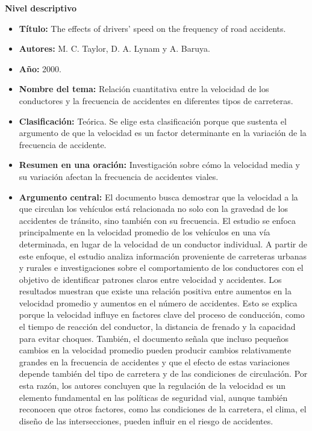 \documentclass[12pt]{article}
\begin{document}
\textbf{Nivel descriptivo}
\begin{itemize}
    \item \textbf{Título:} The effects of drivers' speed on the frequency of road accidents. 
    
    \item \textbf{Autores:} M. C. Taylor, D. A. Lynam y A. Baruya. 
    
    \item \textbf{Año:} 2000. 
    
    \item \textbf{Nombre del tema:} Relación cuantitativa entre la velocidad de los conductores y la frecuencia de accidentes en diferentes tipos de carreteras. 

    \item \textbf{Clasificación:} Teórica. Se elige esta clasificación porque que sustenta el argumento de que la velocidad es un factor determinante en la variación de la frecuencia de accidente. 

    \item \textbf{Resumen en una oración:} Investigación sobre cómo la velocidad media y su variación afectan la frecuencia de accidentes viales. 

    \item \textbf{Argumento central:} El documento busca demostrar que la velocidad a la que circulan los vehículos está relacionada no solo con la gravedad de los accidentes de tránsito, sino también con su frecuencia. El estudio se enfoca principalmente en la velocidad promedio de los vehículos en una vía determinada, en lugar de la velocidad de un conductor individual. A partir de este enfoque, el estudio analiza información proveniente de carreteras urbanas y rurales e investigaciones sobre el comportamiento de los conductores con el objetivo de identificar patrones claros entre velocidad y accidentes. Los resultados muestran que existe una relación positiva entre aumentos en la velocidad promedio y aumentos en el número de accidentes. Esto se explica porque la velocidad influye en factores clave del proceso de conducción, como el tiempo de reacción del conductor, la distancia de frenado y la capacidad para evitar choques. También, el documento señala que incluso pequeños cambios en la velocidad promedio pueden producir cambios relativamente grandes en la frecuencia de accidentes y que el efecto de estas variaciones depende también del tipo de carretera y de las condiciones de circulación. Por esta razón, los autores concluyen que la regulación  de la velocidad es un elemento fundamental en las políticas de seguridad vial, aunque también reconocen que otros factores, como las condiciones de la carretera, el clima, el diseño de las intersecciones, pueden influir en el riesgo de accidentes. 
 

\end{itemize}
\end{document}

